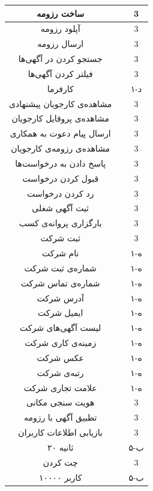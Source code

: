\documentclass[12pt,svgnames,oneside]{book}
\newcommand{\myc}{\lr{C}}
\newcommand{\mya}{\lr{A}}
\newcommand{\asus}{\lr{AS(user, system)}}
\newcommand{\asjs}{\lr{AS(job seeker, system)}}
\newcommand{\asje}{\lr{AS(job seeker, the employer)}}
\newcommand{\ases}{\lr{AS(the employer, system)}}
\newcommand{\asej}{\lr{AS(the employer, job seeker)}}
\newcommand{\aser}{\lr{AS(the employer, requests)}}
\newcommand{\asse}{\lr{AS(system, the employer)}}
\newcommand{\assj}{\lr{AS(system, job seeker)}}
\newcommand{\assu}{\lr{AS(system, user)}}
\newcommand{\myv}{\lr{V}}
\newcommand{\oneh}{۱-ه}
\newcommand{\oned}{۱-د}
\newcommand{\fiveb}{۵-ب}
\begin{document}
\begin{longtable}{|c|c|c|}
\hline
ساخت رزومه &
\asjs &
3 \\
\hline
آپلود رزومه &
\asjs &
3 \\
\hline
ارسال رزومه &
\asje &
3 \\
\hline
 جستجو کردن در آگهی‌ها &
\asus &
3 \\
\hline
فیلتر کردن آگهی‌ها &
\asus &
3 \\
\hline
کارفرما &
\myc &
\oned \\
\hline
مشاهده‌ی کارجویان پیشنهادی &
\ases &
3 \\
\hline
مشاهده‌ی پروفایل کارجویان &
\asus &
3 \\
\hline
ارسال پیام دعوت به همکاری &
\asej &
3 \\
\hline
مشاهده‌ی رزومه‌ی کارجویان &
\asus &
3 \\
\hline
پاسخ دادن به درخواست‌ها &
\aser &
3 \\
\hline
قبول کردن درخواست &
\aser &
3 \\
\hline
رد کردن درخواست &
\aser &
3 \\
\hline
ثبت آگهی‌ شغلی &
\ases &
3 \\
\hline
بارگزاری پروانه‌ی کسب &
\ases &
3 \\
\hline
ثبت شرکت & 
\ases & 
3 \\
\hline
نام شرکت & 
\mya & 
\oneh \\
\hline
شماره‌ی ثبت شرکت & 
\mya & 
\oneh \\
\hline
شماره‌ی تماس شرکت & 
\mya & 
\oneh \\
\hline
آدرس شرکت & 
\mya & 
\oneh \\
\hline
ایمیل شرکت & 
\mya & 
\oneh \\
\hline
لیست آگهی‌های شرکت & 
\mya & 
\oneh \\
\hline
زمینه‌ی کاری شرکت & 
\mya & 
\oneh \\
\hline
عکس شرکت & 
\mya & 
\oneh \\
\hline
رتبه‌ی شرکت & 
\mya & 
\oneh \\
\hline
علامت تجاری شرکت & 
\mya & 
\oneh \\
\hline
هویت سنجی مکانی & 
\asse & 
3 \\
\hline
تطبیق آگهی با رزومه & 
\assj & 
3 \\
\hline
بازیابی اطلاعات کاربران & 
\assu & 
3 \\
\hline
۲۰ ثانیه & 
\myv & 
\fiveb \\
\hline
چت کردن & 
\asje & 
3 \\
\hline
۱۰۰۰۰ کاربر & 
\myv & 
\fiveb \\
\hline
\end{longtable}
\label{table:domain}
\end{document}
